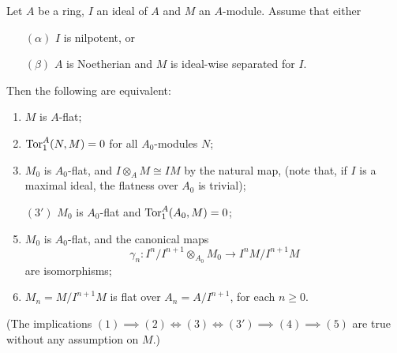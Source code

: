 \documentclass[../main]{subfiles}
\begin{document}
\begin{partheorem}\label{thm:049}
Let $A$ be a ring, $I$ an ideal of $A$ and $M$ an $A$-module. Assume that either
\begin{enumerate}
    \item[$(\alpha)$] $I$ is nilpotent, or
    \item[$(\beta)$] $A$ is Noetherian and $M$ is ideal-wise separated for $I$.
\end{enumerate}
Then the following are equivalent:
\begin{enumerate}[label=(\arabic*)]
    \item $M$ is $A$-flat;
    \item $\operatorname{Tor}_1^A(N,M)=0$ for all $A_0$-modules $N$;
    \item $M_0$ is $A_0$-flat, and $I\otimes_A M\cong IM$ by the natural map, (note that, if $I$ is a maximal ideal, the flatness over $A_0$ is trivial);
    \item[$(3')$] $M_0$ is $A_0$-flat and $\operatorname{Tor}_1^A(A_0,M)=0$;
    \setcounter{enumi}{3}
    \item $M_0$ is $A_0$-flat, and the canonical maps \[\gamma_n\colon I^n/I^{n+1}\otimes_{A_0}M_0\longrightarrow I^nM/I^{n+1}M\] are isomorphisms;
    \item $M_n=M/I^{n+1}M$ is flat over $A_n=A/I^{n+1}$, for each $n\geqslant0$.
\end{enumerate}
(The implications $(1)\implies (2)\iff (3)\iff (3') \implies (4) \implies (5)$ are true without any assumption on $M$.)
\end{partheorem}
\end{document}
